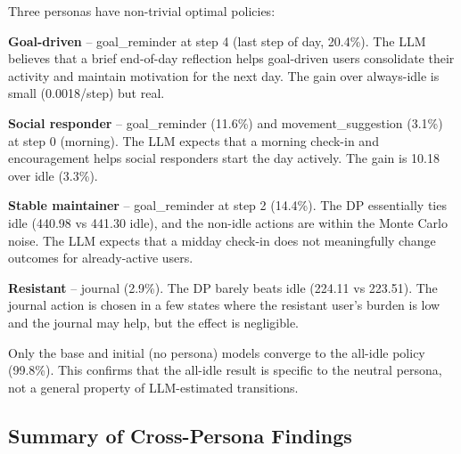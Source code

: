 \documentclass[11pt]{article}
\begin{document}
Three personas have non-trivial optimal policies:

\textbf{Goal-driven} -- goal\_reminder at step 4 (last step of day, 20.4\%). The LLM believes that a brief end-of-day reflection helps goal-driven users consolidate their activity and maintain motivation for the next day. The gain over always-idle is small (0.0018/step) but real.

\textbf{Social responder} -- goal\_reminder (11.6\%) and movement\_suggestion (3.1\%) at step 0 (morning). The LLM expects that a morning check-in and encouragement helps social responders start the day actively. The gain is 10.18 over idle (3.3\%).

\textbf{Stable maintainer} -- goal\_reminder at step 2 (14.4\%). The DP essentially ties idle (440.98 vs 441.30 idle), and the non-idle actions are within the Monte Carlo noise. The LLM expects that a midday check-in does not meaningfully change outcomes for already-active users.

\textbf{Resistant} -- journal (2.9\%). The DP barely beats idle (224.11 vs 223.51). The journal action is chosen in a few states where the resistant user's burden is low and the journal may help, but the effect is negligible.

Only the base and initial (no persona) models converge to the all-idle policy (99.8\%). This confirms that the all-idle result is specific to the neutral persona, not a general property of LLM-estimated transitions.

\subsection{Summary of Cross-Persona Findings}
\end{document}
